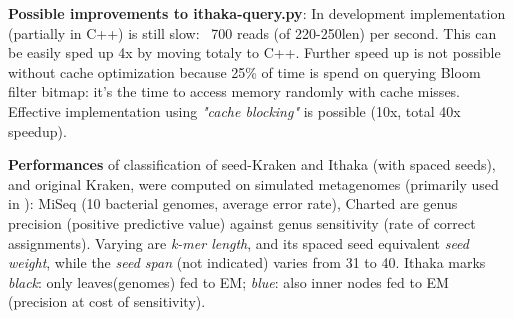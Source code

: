 \documentclass[portrait,final,a0paper,fontscale=0.277]{baposter}
\begin{document}
\begin{poster}
{\begin{minipage}{0.46\textwidth}
%
{\bf Possible improvements to ithaka-query.py}:
In development implementation (partially in C++) is still slow: ~700 reads (of 220-250len) per second. This can be easily sped up 4x by moving totaly to C++.
Further speed up is not possible without cache optimization because 25\% of time is spend on querying Bloom filter bitmap: it's the time to access memory randomly with cache misses. Effective implementation using {\em "cache blocking"} is possible (10x, total 40x speedup).
% 
% 


{\bf Performances} of classification of {\sc seed-Kraken}\cite{sseed} and {\sc Ithaka} (with spaced seeds), and original {\sc Kraken}, 
were computed on simulated metagenomes (primarily used in \cite{kraken}):    
    MiSeq (10 bacterial genomes, average error rate), 
    Charted are genus precision (positive predictive value) against genus sensitivity (rate of correct assignments). Varying are {\em k-mer length}, and its spaced seed equivalent {\em seed weight}, while the {\em seed span} (not indicated) varies from 31 to 40.
Ithaka marks {\em black}: only leaves(genomes) fed to EM; {\em blue}: also inner nodes fed to EM (precision at cost of sensitivity).
    

\end{minipage}}
\end{poster}
\end{document}
